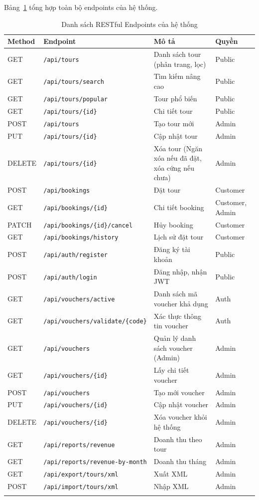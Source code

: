 \noindent Bảng~\ref{table:endpoints} tổng hợp toàn bộ
endpoints của hệ thống.

\begin{longtable}{|l|l|l|l|}
  \hline
  \textbf{Method} & \textbf{Endpoint} & \textbf{Mô tả} & \textbf{Quyền} \\
  \hline
  GET & \texttt{/api/tours} & Danh sách tour (phân trang, lọc)
      & Public \\
  GET & \texttt{/api/tours/search} & Tìm kiếm nâng cao
      & Public \\
  GET & \texttt{/api/tours/popular} & Tour phổ biến
      & Public \\
  GET & \texttt{/api/tours/\{id\}} & Chi tiết tour
      & Public \\
  POST & \texttt{/api/tours} & Tạo tour mới
      & Admin \\
  PUT & \texttt{/api/tours/\{id\}} & Cập nhật tour
      & Admin \\
  DELETE & \texttt{/api/tours/\{id\}} & Xóa tour (Ngăn xóa nếu đã đặt, xóa cứng nếu chưa)
      & Admin \\
  \hline
  POST & \texttt{/api/bookings} & Đặt tour
      & Customer \\
  GET & \texttt{/api/bookings/\{id\}} & Chi tiết booking
      & Customer, Admin \\
  PATCH & \texttt{/api/bookings/\{id\}/cancel} & Hủy booking
      & Customer \\
  GET & \texttt{/api/bookings/history} & Lịch sử đặt tour
      & Customer \\
  \hline
  POST & \texttt{/api/auth/register} & Đăng ký tài khoản
      & Public \\
  POST & \texttt{/api/auth/login} & Đăng nhập, nhận JWT
      & Public \\
  \hline
  GET & \texttt{/api/vouchers/active} & Danh sách mã voucher khả dụng
      & Auth \\
  GET & \texttt{/api/vouchers/validate/\{code\}} & Xác thực thông tin voucher
      & Auth \\
  GET & \texttt{/api/vouchers} & Quản lý danh sách voucher (Admin)
      & Admin \\
  GET & \texttt{/api/vouchers/\{id\}} & Lấy chi tiết voucher
      & Admin \\
  POST & \texttt{/api/vouchers} & Tạo mới voucher
      & Admin \\
  PUT & \texttt{/api/vouchers/\{id\}} & Cập nhật voucher
      & Admin \\
  DELETE & \texttt{/api/vouchers/\{id\}} & Xóa voucher khỏi hệ thống
      & Admin \\
  \hline
  GET & \texttt{/api/reports/revenue} & Doanh thu theo tour
      & Admin \\
  GET & \texttt{/api/reports/revenue-by-month} & Doanh thu tháng
      & Admin \\
  GET & \texttt{/api/export/tours/xml} & Xuất XML
      & Admin \\
  POST & \texttt{/api/import/tours/xml} & Nhập XML
      & Admin \\
  \hline
  \caption{Danh sách RESTful Endpoints của hệ thống}
  \label{table:endpoints}
\end{longtable}

